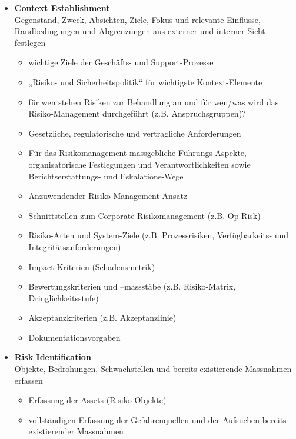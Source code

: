 \documentclass[10pt,a4paper]{article}
\begin{document}
\begin{itemize}[noitemsep,topsep=0pt,leftmargin=*]
    \item \textbf{Context Establishment}\\Gegenstand, Zweck, Absichten,
    Ziele, Fokus und relevante Einflüsse, Randbedingungen und
    Abgrenzungen aus externer und interner Sicht festlegen
    \begin{itemize}[noitemsep,topsep=0pt,leftmargin=*]
        \item wichtige Ziele der Geschäfts- und Support-Prozesse
        \item „Risiko- und Sicherheitspolitik“ für wichtigste Kontext-Elemente
        \item für wen stehen Risiken zur Behandlung an und für wen/was wird das Risiko-Management durchgeführt (z.B. Anspruchsgruppen)?
        \item Gesetzliche, regulatorische und vertragliche Anforderungen
        \item Für das Risikomanagement massgebliche Führungs-Aspekte, organisatorische Festlegungen und Verantwortlichkeiten sowie Berichtserstattungs- und Eskalations-Wege
        \item Anzuwendender Risiko-Management-Ansatz
        \item Schnittstellen zum Corporate Risikomanagement (z.B. Op-Risk)
        \item Risiko-Arten und System-Ziele (z.B. Prozessrisiken, Verfügbarkeits- und Integritätsanforderungen)
        \item Impact Kriterien (Schadensmetrik)
        \item Bewertungskriterien und –massstäbe (z.B. Risiko-Matrix, Dringlichkeitsstufe)
        \item Akzeptanzkriterien (z.B. Akzeptanzlinie)
        \item Dokumentationsvorgaben
    \end{itemize}
    \item \textbf{Risk Identification}\\Objekte, Bedrohungen,
    Schwachstellen und bereits existierende Massnahmen
    erfassen
    \begin{itemize}[noitemsep,topsep=0pt,leftmargin=*]
        \item Erfassung der Assets (Risiko-Objekte)
        \item vollständigen Erfassung der Gefahrenquellen und der Aufsuchen bereits existierender Massnahmen

\end{itemize}
\end{itemize}
\end{document}
